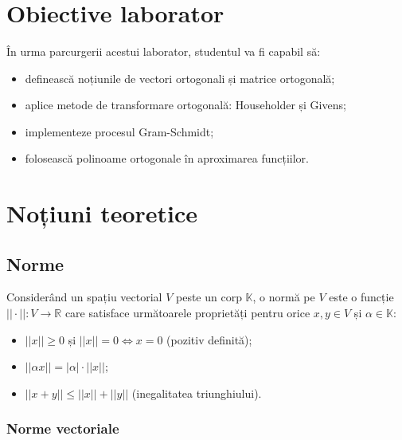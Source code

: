 \documentclass{exam}
\title{
\textmd{\textbf{\MNLabTitle}}
\author{}
\date{}
}
\begin{document}
\begin{coverpages}
	\maketitle
	\thispagestyle{empty}
	\tableofcontents
\end{coverpages}

\section{Obiective laborator}

În urma parcurgerii acestui laborator, studentul va fi capabil să:
\begin{itemize}
	\item definească noțiunile de vectori ortogonali și matrice ortogonală;
	\item aplice metode de transformare ortogonală: Householder și Givens;
	\item implementeze procesul Gram-Schmidt;
	\item folosească polinoame ortogonale în aproximarea funcțiilor.
\end{itemize}

\section{Noțiuni teoretice}

\subsection{Norme}

Considerând un spațiu vectorial $V$ peste un corp $\mathbb{K}$, o normă pe
$V$ este o funcție $||\cdot||: V \rightarrow \mathbb{R}$ care satisface
următoarele proprietăți pentru orice $x, y \in V$ și $\alpha \in \mathbb{K}$:
\begin{itemize}
	\item $||x|| \geq 0$ și $||x|| = 0 \Leftrightarrow x = 0$ (pozitiv definită);
	\item $||\alpha x|| = |\alpha| \cdot ||x||$;
	\item $||x + y|| \leq ||x|| + ||y||$ (inegalitatea triunghiului).
\end{itemize}

\subsubsection{Norme vectoriale}
\end{document}
